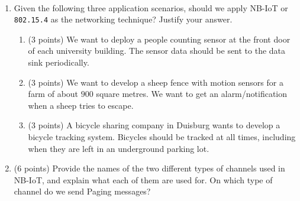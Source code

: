\documentclass[12pt]{article}
\begin{document}
    \begin{ejercicio}[15 points]
        ~
        \begin{enumerate}[label=\alph*)]
            \item Given the following three application scenarios, should we apply NB-IoT or \verb|802.15.4| as the networking technique? Justify your answer.
            \begin{enumerate}[label=\roman*)]
                \item (3 points) We want to deploy a people counting sensor at the front door of each university building. The sensor data should be sent to the data sink periodically.
                \item (3 points) We want to develop a sheep fence with motion sensors for a farm of about $900$ square metres. We want to get an alarm/notification when a sheep tries to escape.
                \item (3 points) A bicycle sharing company in Duisburg wants to develop a bicycle tracking system. Bicycles should be tracked at all times, including when they are left in an underground parking lot.
            \end{enumerate}
            \item (6 points) Provide the names of the two different types of channels used in NB-IoT, and explain what each of them are used for. On which type of channel do we send Paging messages?
        \end{enumerate}
    \end{ejercicio}

    \newpage
\end{document}
